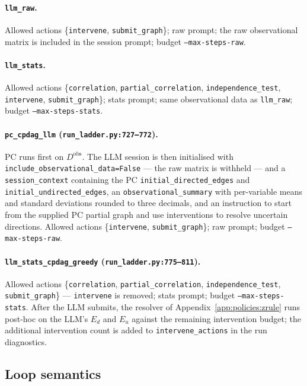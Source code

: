 \paragraph{\texttt{llm\_raw}.} Allowed actions \{\texttt{intervene}, \texttt{submit\_graph}\}; raw prompt; the raw observational matrix is included in the session prompt; budget \texttt{--max-steps-raw}.

\paragraph{\texttt{llm\_stats}.} Allowed actions \{\texttt{correlation}, \texttt{partial\_correlation}, \texttt{independence\_test}, \texttt{intervene}, \texttt{submit\_graph}\}; stats prompt; same observational data as \texttt{llm\_raw}; budget \texttt{--max-steps-stats}.

\paragraph{\texttt{pc\_cpdag\_llm} (\texttt{run\_ladder.py:727--772}).} PC runs first on $D^{\text{obs}}$. The LLM session is then initialised with \texttt{include\_observational\_data=False} --- the raw matrix is withheld --- and a \texttt{session\_context} containing the PC \texttt{initial\_directed\_edges} and \texttt{initial\_undirected\_edges}, an \texttt{observational\_summary} with per-variable means and standard deviations rounded to three decimals, and an instruction to start from the supplied PC partial graph and use interventions to resolve uncertain directions. Allowed actions \{\texttt{intervene}, \texttt{submit\_graph}\}; raw prompt; budget \texttt{--max-steps-raw}.

\paragraph{\texttt{llm\_stats\_cpdag\_greedy} (\texttt{run\_ladder.py:775--811}).} Allowed actions \{\texttt{correlation}, \texttt{partial\_correlation}, \texttt{independence\_test}, \texttt{submit\_graph}\} --- \texttt{intervene} is removed; stats prompt; budget \texttt{--max-steps-stats}. After the LLM submits, the resolver of Appendix~\ref{app:policies:zrule} runs post-hoc on the LLM's $E_d$ and $E_u$ against the remaining intervention budget; the additional intervention count is added to \texttt{intervene\_actions} in the run diagnostics.

\subsection{Loop semantics}
\label{app:policies:loop}

